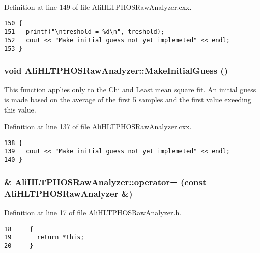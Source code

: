 Definition at line 149 of file Ali\-HLTPHOSRaw\-Analyzer.cxx.

\footnotesize\begin{verbatim}150 {
151   printf("\ntreshold = %d\n", treshold);
152   cout << "Make initial guess not yet implemeted" << endl;  
153 }
\end{verbatim}\normalsize 


\subsubsection{\setlength{\rightskip}{0pt plus 5cm}void Ali\-HLTPHOSRaw\-Analyzer::Make\-Initial\-Guess ()}\label{classAliHLTPHOSRawAnalyzer_AliHLTPHOSRawAnalyzerPeakFindera15}


This function applies only to the Chi and Least mean square fit. An initial guess is made based on the average of the first 5 samples and the first value exeeding this value. 

Definition at line 137 of file Ali\-HLTPHOSRaw\-Analyzer.cxx.

\footnotesize\begin{verbatim}138 {
139   cout << "Make initial guess not yet implemeted" << endl;
140 }
\end{verbatim}\normalsize 


\subsubsection{\& Ali\-HLTPHOSRaw\-Analyzer::operator= (const {\bf Ali\-HLTPHOSRaw\-Analyzer} \&)\hspace{0.3cm}{\tt  [inline]}}\label{classAliHLTPHOSRawAnalyzer_AliHLTPHOSRawAnalyzera4}




Definition at line 17 of file Ali\-HLTPHOSRaw\-Analyzer.h.

\footnotesize\begin{verbatim}18     {
19       return *this;
20     }
\end{verbatim}\normalsize 


